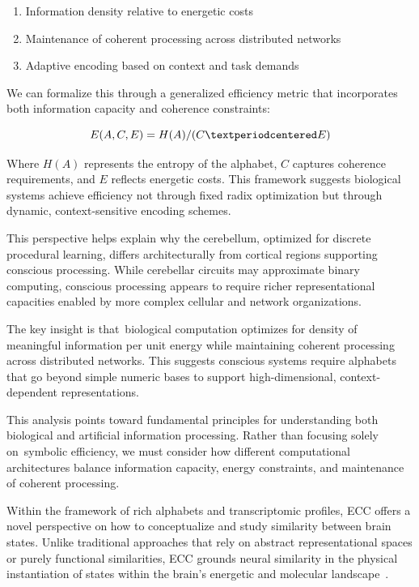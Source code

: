 \begin{enumerate}
    \item {}Information density relative to energetic costs
    \item Maintenance of coherent processing across distributed networks
    \item Adaptive encoding based on context and task demands
\end{enumerate}

We can formalize this through a generalized efficiency metric that incorporates both information capacity and coherence constraints:

\begin{equation}
  E(A,C,E) = H(A)/(C·E)
  \myequation{Generalized efficiency metric for biological computation}
  \label{eq:generalized_efficiency}
\end{equation}

Where $H(A)$ represents the entropy of the alphabet, $C$ captures coherence requirements, and $E$ reflects energetic costs. This framework suggests biological systems achieve efficiency not through fixed radix optimization but through dynamic, context-sensitive encoding schemes.

This perspective helps explain why the cerebellum, optimized for discrete procedural learning, differs architecturally from cortical regions supporting conscious processing. While cerebellar circuits may approximate binary computing, conscious processing appears to require richer representational capacities enabled by more complex cellular and network organizations.

The key insight is that~biological computation optimizes for density of meaningful information per unit energy while maintaining coherent processing across distributed networks. This suggests conscious systems require alphabets that go beyond simple numeric bases to support high-dimensional, context-dependent representations.

This analysis points toward fundamental principles for understanding both biological and artificial information processing. Rather than focusing solely on~symbolic efficiency, we must consider how different computational architectures balance information capacity, energy constraints, and maintenance of coherent processing.

Within the framework of rich alphabets and transcriptomic profiles, ECC offers a novel perspective on how to conceptualize and study similarity between brain states. Unlike traditional approaches that rely on abstract representational spaces or purely functional similarities, ECC grounds neural similarity in the physical instantiation of states within the brain's energetic and molecular landscape~\cite{bobadilla-suarez2020measures}.

